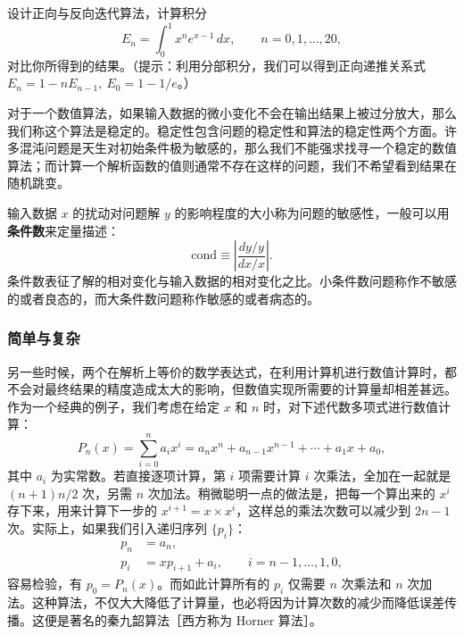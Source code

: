 \begin{exerciseBox}[练习 1.2]
设计正向与反向迭代算法，计算积分
\[
E_n=\int_0^1 x^n e^{x-1}\,dx,\qquad n=0,1,\ldots,20,
\]
对比你所得到的结果。（提示：利用分部积分，我们可以得到正向递推关系式 $E_n=1-nE_{n-1},\ E_0=1-1/e$。）
\end{exerciseBox}

对于一个数值算法，如果输入数据的微小变化不会在输出结果上被过分放大，那么我们称这个算法是稳定的。稳定性包含问题的稳定性和算法的稳定性两个方面。许多混沌问题是天生对初始条件极为敏感的，那么我们不能强求找寻一个稳定的数值算法；而计算一个解析函数的值则通常不存在这样的问题，我们不希望看到结果在随机跳变。

输入数据 $x$ 的扰动对问题解 $y$ 的影响程度的大小称为问题的敏感性，一般可以用\textbf{条件数}来定量描述：
\begin{equation}
\mathrm{cond}\equiv\left|\frac{dy/y}{dx/x}\right|.
\tag{1.1.9}
\end{equation}
条件数表征了解的相对变化与输入数据的相对变化之比。小条件数问题称作不敏感的或者良态的，而大条件数问题称作敏感的或者病态的。

\subsubsection{简单与复杂}

另一些时候，两个在解析上等价的数学表达式，在利用计算机进行数值计算时，都不会对最终结果的精度造成太大的影响，但数值实现所需要的计算量却相差甚远。作为一个经典的例子，我们考虑在给定 $x$ 和 $n$ 时，对下述代数多项式进行数值计算：
\begin{equation}
P_n(x)=\sum_{i=0}^{n}a_i x^i=a_nx^n+a_{n-1}x^{n-1}+\cdots+a_1x+a_0,
\tag{1.1.10}
\end{equation}
其中 $a_i$ 为实常数。若直接逐项计算，第 $i$ 项需要计算 $i$ 次乘法，全加在一起就是 $(n+1)n/2$ 次，另需 $n$ 次加法。稍微聪明一点的做法是，把每一个算出来的 $x^i$ 存下来，用来计算下一步的 $x^{i+1}=x\times x^i$，这样总的乘法次数可以减少到 $2n-1$ 次。实际上，如果我们引入递归序列 $\{p_i\}$：
\begin{equation}
\begin{aligned}
p_n&=a_n,\\
p_i&=xp_{i+1}+a_i,\qquad i=n-1,\ldots,1,0,
\end{aligned}
\tag{1.1.11}
\end{equation}
容易检验，有 $p_0=P_n(x)$。而如此计算所有的 $p_i$ 仅需要 $n$ 次乘法和 $n$ 次加法。这种算法，不仅大大降低了计算量，也必将因为计算次数的减少而降低误差传播。这便是著名的秦九韶算法［西方称为 Horner 算法］。

